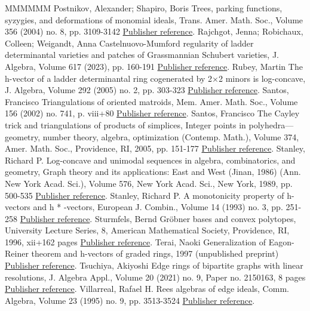 \documentclass[11pt]{article}
\theoremstyle{definition}
\numberwithin{equation}{section}
\begin{document}
\begin{thebibliography}{MMMMMM}
 Postnikov, Alexander; Shapiro, Boris Trees, parking functions, syzygies, and deformations of monomial ideals, Trans. Amer. Math. Soc., Volume 356 (2004) no. 8, pp. 3109-3142 \href{https://alco.centre-mersenne.org/articles/10.5802/alco.404/#postnikovshapiro}{Publisher reference}.
 Rajchgot, Jenna; Robichaux, Colleen; Weigandt, Anna Castelnuovo-Mumford regularity of ladder determinantal varieties and patches of Grassmannian Schubert varieties, J. Algebra, Volume 617 (2023), pp. 160-191 \href{https://alco.centre-mersenne.org/articles/10.5802/alco.404/#rajchgot2022castelnuovo}{Publisher reference}.
 Rubey, Martin The h-vector of a ladder determinantal ring cogenerated by 2×2 minors is log-concave, J. Algebra, Volume 292 (2005) no. 2, pp. 303-323 \href{https://alco.centre-mersenne.org/articles/10.5802/alco.404/#rubey2005h}{Publisher reference}.
 Santos, Francisco Triangulations of oriented matroids, Mem. Amer. Math. Soc., Volume 156 (2002) no. 741, p. viii+80 \href{https://alco.centre-mersenne.org/articles/10.5802/alco.404/#San02}{Publisher reference}.
 Santos, Francisco The Cayley trick and triangulations of products of simplices, Integer points in polyhedra—geometry, number theory, algebra, optimization (Contemp. Math.), Volume 374, Amer. Math. Soc., Providence, RI, 2005, pp. 151-177 \href{https://alco.centre-mersenne.org/articles/10.5802/alco.404/#santos2005cayley}{Publisher reference}.
 Stanley, Richard P. Log-concave and unimodal sequences in algebra, combinatorics, and geometry, Graph theory and its applications: East and West (Jinan, 1986) (Ann. New York Acad. Sci.), Volume 576, New York Acad. Sci., New York, 1989, pp. 500-535 \href{https://alco.centre-mersenne.org/articles/10.5802/alco.404/#stanley1989log}{Publisher reference}.
 Stanley, Richard P. A monotonicity property of h-vectors and h * -vectors, European J. Combin., Volume 14 (1993) no. 3, pp. 251-258 \href{https://alco.centre-mersenne.org/articles/10.5802/alco.404/#stanley1993}{Publisher reference}.
 Sturmfels, Bernd Gröbner bases and convex polytopes, University Lecture Series, 8, American Mathematical Society, Providence, RI, 1996, xii+162 pages \href{https://alco.centre-mersenne.org/articles/10.5802/alco.404/#sturmfels1996grobner}{Publisher reference}.
 Terai, Naoki Generalization of Eagon-Reiner theorem and h-vectors of graded rings, 1997 (unpublished preprint) \href{https://alco.centre-mersenne.org/articles/10.5802/alco.404/#terai1997generalization}{Publisher reference}.
 Tsuchiya, Akiyoshi Edge rings of bipartite graphs with linear resolutions, J. Algebra Appl., Volume 20 (2021) no. 9, Paper no. 2150163, 8 pages \href{https://alco.centre-mersenne.org/articles/10.5802/alco.404/#tsuchiya2021}{Publisher reference}.
 Villarreal, Rafael H. Rees algebras of edge ideals, Comm. Algebra, Volume 23 (1995) no. 9, pp. 3513-3524 \href{https://alco.centre-mersenne.org/articles/10.5802/alco.404/#villarreal1995rees}{Publisher reference}.
\end{thebibliography}
\end{document}
